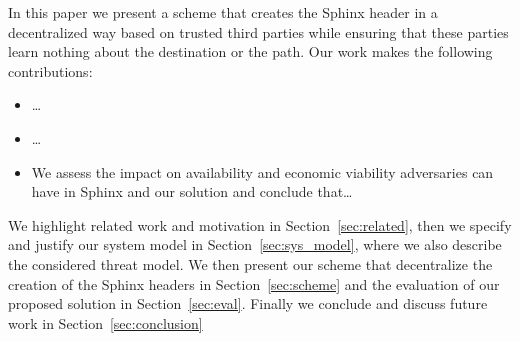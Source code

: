 In this paper we present a scheme that creates the Sphinx header in a
decentralized way based on trusted third parties while ensuring that these
parties learn nothing about the destination or the path.
%
%
Our work makes the
following contributions:
%
\begin{itemize}
%
  \item{\ldots}
%
  \item{\ldots}
%
  \item{We assess the impact on availability and economic viability
adversaries can have in Sphinx and our solution and conclude that\ldots}
%
\end{itemize}
%

We highlight related work and motivation in Section~\ref{sec:related}, then we specify and justify our system model in Section~\ref{sec:sys_model}, where we also describe the considered threat model. We then present our scheme that decentralize the creation of the Sphinx headers in Section~\ref{sec:scheme} and the evaluation of our proposed solution in Section~\ref{sec:eval}. Finally we conclude and discuss future work in Section~\ref{sec:conclusion}
